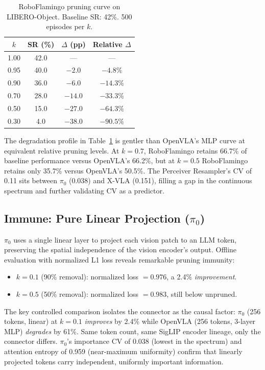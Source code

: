 \documentclass[letterpaper]{article}
\begin{document}
\begin{table}[h]
\centering
\caption{RoboFlamingo pruning curve on LIBERO-Object. Baseline SR: 42\%. 500 episodes per $k$.}
\label{tab:roboflamingo_curve}
\small
\begin{tabular}{cccc}
\toprule
$k$ & \textbf{SR (\%)} & $\Delta$ \textbf{(pp)} & \textbf{Relative $\Delta$} \\
\midrule
1.00 & 42.0 & --- & --- \\
0.95 & 40.0 & $-2.0$ & $-4.8\%$ \\
0.90 & 36.0 & $-6.0$ & $-14.3\%$ \\
0.70 & 28.0 & $-14.0$ & $-33.3\%$ \\
0.50 & 15.0 & $-27.0$ & $-64.3\%$ \\
0.30 & 4.0 & $-38.0$ & $-90.5\%$ \\
\bottomrule
\end{tabular}
\end{table}

The degradation profile in Table~\ref{tab:roboflamingo_curve} is gentler than OpenVLA's MLP curve at equivalent relative pruning levels. At $k=0.7$, RoboFlamingo retains 66.7\% of baseline performance versus OpenVLA's 66.2\%, but at $k=0.5$ RoboFlamingo retains only 35.7\% versus OpenVLA's 50.5\%. The Perceiver Resampler's CV of 0.11 sits between $\pi_0$ (0.038) and X-VLA (0.151), filling a gap in the continuous spectrum and further validating CV as a predictor.

\subsection{Immune: Pure Linear Projection ($\pi_0$)}

$\pi_0$ uses a single linear layer to project each vision patch to an LLM token, preserving the spatial independence of the vision encoder's output. Offline evaluation with normalized L1 loss reveals remarkable pruning immunity:
\begin{itemize}
    \item $k=0.1$ (90\% removal): normalized loss $= 0.976$, a 2.4\% \emph{improvement}.
    \item $k=0.5$ (50\% removal): normalized loss $= 0.983$, still below unpruned.
\end{itemize}

The key controlled comparison isolates the connector as the causal factor: $\pi_0$ (256 tokens, linear) at $k=0.1$ \emph{improves} by 2.4\% while OpenVLA (256 tokens, 3-layer MLP) \emph{degrades} by 61\%. Same token count, same SigLIP encoder lineage, only the connector differs. $\pi_0$'s importance CV of 0.038 (lowest in the spectrum) and attention entropy of 0.959 (near-maximum uniformity) confirm that linearly projected tokens carry independent, uniformly important information.
\end{document}
